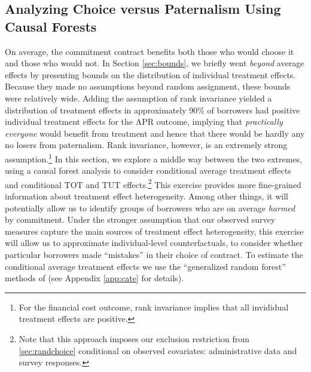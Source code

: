 \documentclass[12pt, a4paper]{article}
\begin{document}
\subsection{Analyzing Choice versus Paternalism Using Causal Forests} \label{sec:RF}


On average, the commitment contract benefits both those who would choose it and those who would not.
In Section \ref{sec:bounds}, we briefly went \emph{beyond} average effects by presenting bounds on the distribution of individual treatment effects.
Because they made no assumptions beyond random assignment, these bounds were relatively wide.
Adding the assumption of rank invariance yielded a distribution of treatment effects in approximately 90\% of borrowers had positive individual treatment effects for the APR outcome, implying that \emph{practically everyone} would benefit from treatment and hence that there would be hardly any no losers from paternalism.
Rank invariance, however, is an extremely strong assumption.\footnote{For the financial cost outcome, rank invariance implies that all invididual treatment effects are positive.}
In this section, we explore a middle way between the two extremes, using a causal forest analysis to consider conditional average treatment effects and conditional TOT and TUT effects.\footnote{Note that this approach imposes our exclusion restriction from \ref{sec:randchoice} conditional on observed covariates: administrative data and survey responses.} 
This exercise provides more fine-grained information about treatment effect heterogeneity.
Among other things, it will potentially allow us to identify groups of borrowers who are on average \emph{harmed} by commitment.
Under the stronger assumption that our observed survey measures capture the main sources of treatment effect heterogeneity, this exercise will allow us to approximate individual-level counterfactuals, to consider whether particular borrowers made ``mistakes'' in their choice of contract. To estimate the conditional average treatment effects we use the ``generalized random forest'' methods of \cite{atheygrf} (see Appendix \ref{app:cate} for details).
\end{document}
